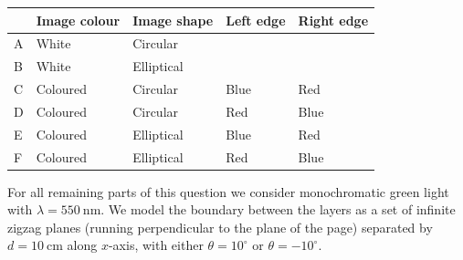 \documentclass[10pt]{article}
\begin{document}
    \begin{center}
    \begin{tabular}{|l|l|l|l|l|}
    \hline
     & Image colour & Image shape & Left edge & Right edge \\
    \hline
    A & White & Circular &  &  \\
    \hline
    B & White & Elliptical &  &  \\
    \hline
    C & Coloured & Circular & Blue & Red \\
    \hline
    D & Coloured & Circular & Red & Blue \\
    \hline
    E & Coloured & Elliptical & Blue & Red \\
    \hline
    F & Coloured & Elliptical & Red & Blue \\
    \hline
    \end{tabular}
    \end{center}
    
    For all remaining parts of this question we consider monochromatic green light with $\lambda=550 \mathrm{~nm}$. We model the boundary between the layers as a set of infinite zigzag planes (running perpendicular to the plane of the page) separated by $d=10 \mathrm{~cm}$ along $x$-axis, with either $\theta=10^{\circ}$ or $\theta=-10^{\circ}$.
    
\end{document}
